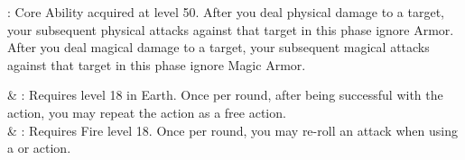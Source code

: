 \begin{ffminipage}
\noindent{}: Core Ability acquired at level 50. After you deal physical damage to a target, your subsequent physical attacks against that target in this phase ignore Armor. After you deal magical damage to a target, your subsequent magical attacks against that target in this phase ignore Magic Armor. \pc%

\begin{jobchoice}
 & %
: Requires level 18 in Earth. Once per round, after being successful with the  action, you may repeat the action as a free action. \\
 & %
: Requires Fire level 18. Once per round, you may re-roll an attack when using a  or  action. \\
\end{jobchoice}
\end{ffminipage}
